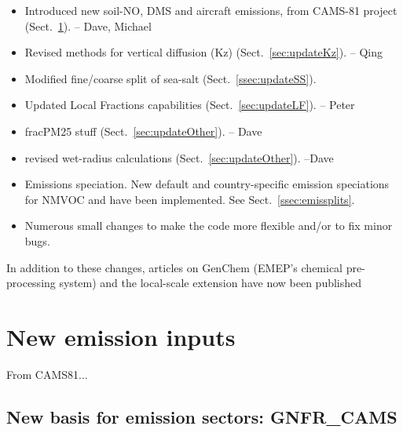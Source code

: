 
\begin{itemize}

\item Introduced new soil-NO, DMS and aircraft emissions, from CAMS-81 project
(Sect.~\ref{sec:updateEmis}).  -- Dave, Michael

\item Revised methods for vertical diffusion (Kz)  (Sect.~\ref{sec:updateKz}). -- Qing

\item Modified fine/coarse split of sea-salt (Sect.~\ref{ssec:updateSS}).

\item
Updated Local Fractions capabilities (Sect.~\ref{sec:updateLF}). -- Peter

\item  fracPM25 stuff (Sect.~\ref{sec:updateOther}). -- Dave
\item revised wet-radius calculations (Sect.~\ref{sec:updateOther}). --Dave


\item
Emissions speciation. New default and country-specific emission
speciations for NMVOC and \pmfine have been implemented.  See
Sect.~\ref{ssec:emissplits}.

\item
Numerous small changes to make the code more flexible and/or to
fix minor bugs.

\end{itemize}

In addition to these changes, articles on GenChem (EMEP's chemical pre-processing system)  and
the local-scale extension  have now been published \citep{Simpson:GenChem,Denby:2020}

\section{New emission inputs}
\label{sec:updateEmis}

From CAMS81...

\subsection{New basis for emission sectors: GNFR\_CAMS}
\label{ssec:gnfr}

